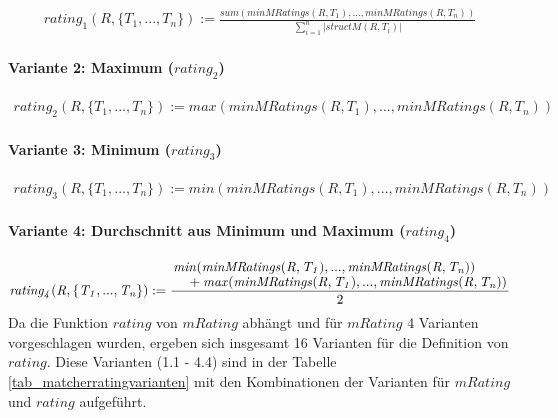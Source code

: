 \begin{gather*}
\mathit{rating_1(R,\{T_1,...,T_n\})} := \frac{\mathit{sum(minMRatings(R,T_1),...,minMRatings(R,T_n))}}{\sum_{i=1}^{n}|\mathit{structM(R,T_i)}|}
\end{gather*}

\paragraph{Variante 2: Maximum ($\mathit{rating}_2$)}

\begin{gather*}
\mathit{rating_2(R,\{T_1,...,T_n\})} := \mathit{max(minMRatings(R,T_1),...,minMRatings(R,T_n))}
\end{gather*}

\paragraph{Variante 3: Minimum ($\mathit{rating}_3$)}

\begin{gather*}
\mathit{rating_3(R,\{T_1,...,T_n\})} := \mathit{min(minMRatings(R,T_1),...,minMRatings(R,T_n))}\end{gather*}

\paragraph{Variante 4: Durchschnitt aus Minimum und Maximum ($\mathit{rating}_4$)}

\begin{gather*}
\mathit{rating_4(R,\{T_1,...,T_n\})} := 
	\frac{\splitfrac{\mathit{min(minMRatings(R,T_1),...,
	minMRatings(R,T_n))}}
	{+ \mathit{max(minMRatings(R,T_1),...,minMRatings(R,T_n))}}}{2}	
\end{gather*}
\noindent
Da die Funktion $\mathit{rating}$ von $\mathit{mRating}$ abhängt und für $\mathit{mRating}$ 4 Varianten vorgeschlagen wurden, ergeben sich insgesamt 16 Varianten für die Definition von $\mathit{rating}$. Diese Varianten (1.1 - 4.4) sind in der Tabelle \ref{tab_matcherratingvarianten} mit den Kombinationen der Varianten für $\mathit{mRating}$ und $\mathit{rating}$ aufgeführt.


